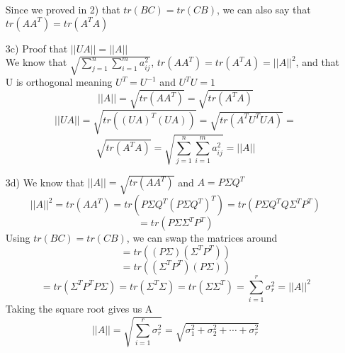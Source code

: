 \documentclass{article}
\begin{document}
\begin{enumerate}
                Since we proved in 2) that $tr(BC) = tr(CB)$, we can also say that $tr(AA^T) = tr(A^TA)$


    \item[3c)] Proof that $||UA|| = ||A||$ \\
    We know that $\sqrt{\sum_{j=1}^n \sum_{i=1}^m a_{ij}^2}$, $tr(AA^T) = tr(A^TA) = ||A||^2$, and that U is orthogonal meaning $U^T = U^{-1}$ and $U^TU = 1$
    $$||A|| = \sqrt{tr(AA^T)} = \sqrt{tr(A^TA)}$$
    $$||UA|| = \sqrt{tr((UA)^T(UA))} = \sqrt{tr(A^TU^TUA)} = $$
    $$\sqrt{tr(A^TA)} = \sqrt{\sum_{j=1}^n \sum_{i=1}^m a_{ij}^2} = ||A||$$
    

    \item[3d)] We know that $||A|| = \sqrt{tr(AA^T)}$ and $A = {P \Sigma Q^T}$
                $$||A||^2 = tr(AA^T) = tr(P \Sigma Q^T (P \Sigma Q^T)^T) = tr(P \Sigma Q^T Q\Sigma^TP^T)$$
                $$ = tr(P\Sigma\Sigma^TP^T)$$
                Using $tr(BC) = tr(CB)$, we can swap the matrices around
                $$= tr((P\Sigma)(\Sigma^TP^T))$$
                $$= tr((\Sigma^TP^T)(P\Sigma))$$
                $$= tr(\Sigma^TP^TP\Sigma) = tr(\Sigma^T\Sigma) = tr(\Sigma\Sigma^T) = \sum_{i=1}^{r} \sigma^2_r = ||A||^2$$
                Taking the square root gives us A
                $$||A|| = \sqrt{\sum_{i=1}^{r} \sigma^2_r} = \sqrt{\sigma_1^2 + \sigma_2^2 + \cdots + \sigma_r^2}$$
    
\end{enumerate}
\end{document}
